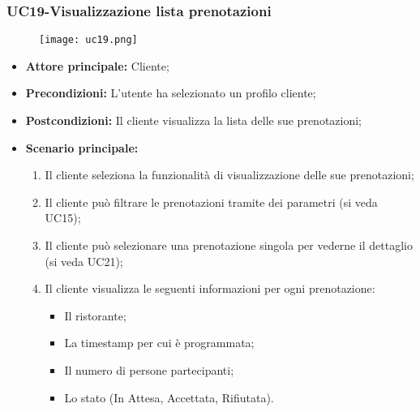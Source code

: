 \subsubsection{UC19-Visualizzazione lista prenotazioni} %
\begin{figure}[h] \texttt{[image: uc19.png]} \end{figure}
\begin{itemize}
    \item \textbf{Attore principale:} Cliente;
    \item \textbf{Precondizioni:} L'utente ha selezionato un profilo cliente;
    \item \textbf{Postcondizioni:} Il cliente visualizza la lista delle sue prenotazioni;
    \item \textbf{Scenario principale:}
        \begin{enumerate}
            \item Il cliente seleziona la funzionalità di visualizzazione delle sue prenotazioni;
            \item Il cliente può filtrare le prenotazioni tramite dei parametri (si veda UC15);
            \item Il cliente può selezionare una prenotazione singola per vederne il dettaglio (si veda UC21);
            \item Il cliente visualizza le seguenti informazioni per ogni prenotazione:
              \begin{itemize}
                \item Il ristorante;
                \item La timestamp per cui è programmata;
                \item Il numero di persone partecipanti;
                \item Lo stato (In Attesa, Accettata, Rifiutata).
              \end{itemize}
        \end{enumerate}
\end{itemize}

